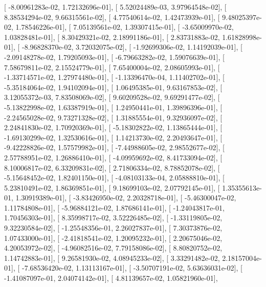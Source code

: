 \documentclass{article}
\begin{document}
       [ -8.00961283e-02,   1.72132696e-01],
       [  5.52024489e-03,   3.97964548e-02],
       [  8.38534294e-02,   9.66315561e-02],
       [  4.77540614e-02,   1.42473939e-01],
       [  9.48025397e-02,   1.78546226e-01],
       [  7.05139561e-02,   1.39307415e-01],
       [ -3.65009970e-02,   1.03828481e-01],
       [  8.30429321e-02,   2.18991186e-01],
       [  2.83731883e-02,   1.61828998e-01],
       [ -8.96828370e-02,   3.72032075e-02],
       [ -1.92699306e-02,   1.14192039e-01],
       [ -2.09148278e-02,   1.79205093e-01],
       [ -6.79663282e-02,   1.59076639e-01],
       [  7.58679811e-02,   2.15524779e-01],
       [  7.65400004e-02,   2.08605993e-01],
       [ -1.33714571e-02,   1.27974480e-01],
       [ -1.13396470e-04,   1.11402702e-01],
       [ -5.35184064e-02,   1.94102094e-01],
       [  1.06495385e-01,   9.63167853e-02],
       [  3.12055372e-03,   7.83508069e-02],
       [  9.60209528e-02,   9.69291477e-02],
       [ -5.13822998e-02,   1.63387919e-01],
       [  1.24950441e-01,   1.39896396e-01],
       [ -2.24565028e-02,   9.73271328e-02],
       [  1.31885554e-01,   9.32936097e-02],
       [  2.24841830e-02,   1.70920369e-01],
       [ -5.18302822e-02,   1.13865444e-01],
       [ -1.69130299e-02,   1.32530616e-01],
       [  1.14213730e-02,   2.20493647e-01],
       [ -9.42228826e-02,   1.57579982e-01],
       [ -7.44988605e-02,   2.98552677e-02],
       [  2.57788951e-02,   1.26886410e-01],
       [ -4.09959692e-02,   8.41733094e-02],
       [  8.10006817e-02,   6.33209831e-02],
       [  2.71806334e-02,   8.78852078e-02],
       [ -5.15648452e-02,   1.82401150e-01],
       [ -4.08103133e-04,   2.05888810e-01],
       [  5.23810491e-02,   1.86369851e-01],
       [  9.18699103e-02,   2.07792145e-01],
       [  1.35355613e-01,   1.30919389e-01],
       [ -3.83426950e-02,   2.20328718e-01],
       [ -5.46300047e-02,   1.11784808e-01],
       [ -5.96884121e-02,   1.87686141e-01],
       [ -1.24043817e-01,   1.70456303e-01],
       [  8.35998717e-02,   3.52226485e-02],
       [ -1.33119805e-02,   9.32230584e-02],
       [ -1.25548356e-01,   2.26027837e-01],
       [  7.30373876e-02,   1.07433000e-01],
       [ -2.41818541e-02,   1.20095232e-01],
       [  2.20675046e-02,   4.20053972e-02],
       [ -4.96082516e-02,   7.79158086e-02],
       [  8.80820752e-02,   1.14742883e-01],
       [  9.26581930e-02,   4.08945233e-02],
       [  3.33291482e-02,   2.18157004e-01],
       [ -7.68536420e-02,   1.13113167e-01],
       [ -3.50707191e-02,   5.63636031e-02],
       [ -1.41087097e-01,   2.04074142e-01],
       [  4.81139657e-02,   1.05821960e-01],
\end{document}
